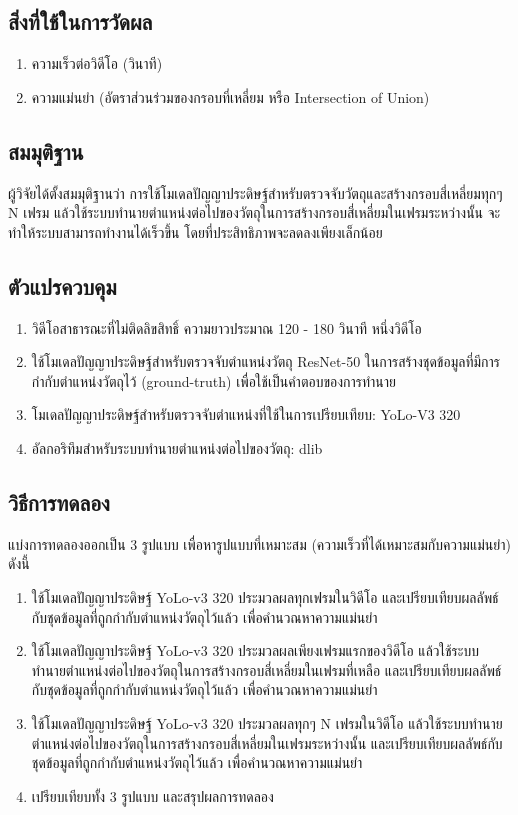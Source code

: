 \subsection*{สิ่งที่ใช้ในการวัดผล}
	\begin{enumerate}
		\item ความเร็วต่อวิดีโอ (วินาที)
		\item ความแม่นยำ (อัตราส่วนร่วมของกรอบที่เหลี่ยม หรือ Intersection of Union)
	\end{enumerate}
\subsection*{สมมุติฐาน}
ผู้วิจัยได้ตั้งสมมุติฐานว่า การใช้โมเดลปัญญาประดิษฐ์สำหรับตรวจจับวัตถุและสร้างกรอบสี่เหลี่ยมทุกๆ N เฟรม 
แล้วใช้ระบบทำนายตำแหน่งต่อไปของวัตถุในการสร้างกรอบสี่เหลี่ยมในเฟรมระหว่างนั้น จะทำให้ระบบสามารถทำงานได้เร็วขึ้น โดยที่ประสิทธิภาพจะลดลงเพียงเล็กน้อย
\subsection*{ตัวแปรควบคุม}
	\begin{enumerate}
		\item วิดีโอสาธารณะที่ไม่ติดลิขสิทธิ์ ความยาวประมาณ 120 - 180 วินาที หนึ่งวิดีโอ
		\item ใช้โมเดลปัญญาประดิษฐ์สำหรับตรวจจับตำแหน่งวัตถุ ResNet-50 ในการสร้างชุดข้อมูลที่มีการกำกับตำแหน่งวัตถุไว้ (ground-truth) เพื่อใช้เป็นคำตอบของการทำนาย
		\item โมเดลปัญญาประดิษฐ์สำหรับตรวจจับตำแหน่งที่ใช้ในการเปรียบเทียบ: YoLo-V3 320
		\item อัลกอริทึมสำหรับระบบทำนายตำแหน่งต่อไปของวัตถุ: dlib
	\end{enumerate}
\subsection*{วิธีการทดลอง}
แบ่งการทดลองออกเป็น 3 รูปแบบ เพื่อหารูปแบบที่เหมาะสม (ความเร็วที่ได้เหมาะสมกับความแม่นยำ) ดังนี้
	\begin{enumerate}
		\item ใช้โมเดลปัญญาประดิษฐ์ YoLo-v3 320 ประมวลผลทุกเฟรมในวิดีโอ และเปรียบเทียบผลลัพธ์กับชุดข้อมูลที่ถูกกำกับตำแหน่งวัตถุไว้แล้ว เพื่อคำนวณหาความแม่นยำ
		\item ใช้โมเดลปัญญาประดิษฐ์ YoLo-v3 320 ประมวลผลเพียงเฟรมแรกของวิดีโอ แล้วใช้ระบบทำนายตำแหน่งต่อไปของวัตถุในการสร้างกรอบสี่เหลี่ยมในเฟรมที่เหลือ 
		และเปรียบเทียบผลลัพธ์กับชุดข้อมูลที่ถูกกำกับตำแหน่งวัตถุไว้แล้ว เพื่อคำนวณหาความแม่นยำ
		\item ใช้โมเดลปัญญาประดิษฐ์ YoLo-v3 320 ประมวลผลทุกๆ N เฟรมในวิดีโอ แล้วใช้ระบบทำนายตำแหน่งต่อไปของวัตถุในการสร้างกรอบสี่เหลี่ยมในเฟรมระหว่างนั้น 
		และเปรียบเทียบผลลัพธ์กับชุดข้อมูลที่ถูกกำกับตำแหน่งวัตถุไว้แล้ว เพื่อคำนวณหาความแม่นยำ
		\item เปรียบเทียบทั้ง 3 รูปแบบ และสรุปผลการทดลอง
\end{enumerate}
